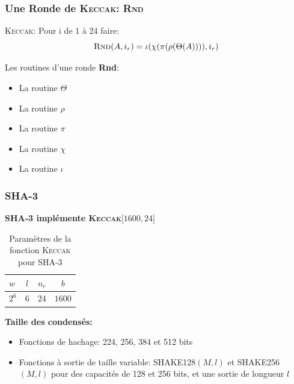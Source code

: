 \begin{frame}
  \frametitle{Une Ronde de \textsc{Keccak}: \textsc{Rnd}}
  \vfill
  \textsc{Keccak}: Pour i de 1 à 24 faire: 
$$\textsc{Rnd}(A,i_r)=\iota ( \chi ( \pi ( \rho (\Theta (A)))), i_r)$$

  \vfill

Les routines d'une ronde \textbf{Rnd}:
  \begin{itemize}
  \item{La routine $\Theta$}
  \item{La routine $\rho$}
  \item{La routine $\pi$}
  \item{La routine $\chi$}
  \item{La routine $\iota$}
   \end{itemize}
  \vfill
\end{frame}


\begin{frame}
  \frametitle{SHA-3}

\vfill
   
\centerline{\textbf{SHA-3 implémente \textsc{Keccak}$\lbrack 1600, 24 \rbrack$}}
 
\bgroup
\def\arraystretch{1.5}
  \begin{table}
\begin{tabular}{l | c | c | c }
$w$ & $l$ & $n_r$ & $b$ \\
\hline
$2^6$ & $6$ & $24$ & $1600 $ 
\end{tabular}
\caption{Paramètres de la fonction \textsc{Keccak} pour SHA-3}

\end{table}

\egroup

\vfill

\textbf{Taille des condensés:}
\begin{itemize}
\item{Fonctions de hachage: 224, 256, 384 et 512 bits}
\item{Fonctions à sortie de taille variable: \textsc{SHAKE128}$(M,l)$ et \textsc{SHAKE256}$(M,l)$  pour des capacités de 128 et 256 bits, et une sortie de longueur $l$ }
\end{itemize}
\vspace{1cm}
\vfill
\end{frame}
